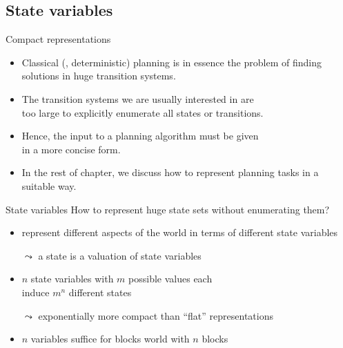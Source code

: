 \documentclass{gkibeamer}
\begin{document}
\subsection{State variables}

\begin{frame}{Compact representations}
  \begin{itemize}
  \item Classical (\ie, deterministic) planning is in essence the
    problem of finding solutions in \alert{huge} transition systems.
  \item The transition systems we are usually interested in are \\
    too large to explicitly enumerate all states or transitions.
  \item Hence, the input to a planning algorithm must be given \\ in a
    more \alert{concise} form.
  \item In the rest of chapter, we discuss how to represent planning
    tasks in a suitable way.
  \end{itemize}
\end{frame}

\begin{frame}{State variables}
  How to represent huge state sets without enumerating them?
  \begin{itemize}
  \item represent different aspects of the world in terms of different
    \alert{state variables}
  \item[$\leadsto$] a state is a \alert{valuation of state variables}
  \item $n$ state variables with $m$ possible values each \\ induce
    $m^n$ different states
  \item[$\leadsto$] \alert{exponentially more compact} than ``flat''
    representations
  \item {} $n$ variables suffice for blocks world with
    $n$ blocks
  \end{itemize}
\end{frame}
\end{document}
